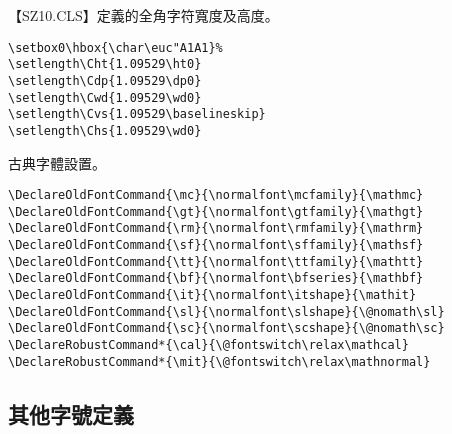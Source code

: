 \par 【SZ10.CLS】定義的全角字符寬度及高度。
\begin{lstlisting}[firstnumber=116]
\setbox0\hbox{\char\euc"A1A1}%
\setlength\Cht{1.09529\ht0}
\setlength\Cdp{1.09529\dp0}
\setlength\Cwd{1.09529\wd0}
\setlength\Cvs{1.09529\baselineskip}
\setlength\Chs{1.09529\wd0}
\end{lstlisting}



\par 古典字體設置。
\begin{lstlisting}[firstnumber=124]
\DeclareOldFontCommand{\mc}{\normalfont\mcfamily}{\mathmc}
\DeclareOldFontCommand{\gt}{\normalfont\gtfamily}{\mathgt}
\DeclareOldFontCommand{\rm}{\normalfont\rmfamily}{\mathrm}
\DeclareOldFontCommand{\sf}{\normalfont\sffamily}{\mathsf}
\DeclareOldFontCommand{\tt}{\normalfont\ttfamily}{\mathtt}
\DeclareOldFontCommand{\bf}{\normalfont\bfseries}{\mathbf}
\DeclareOldFontCommand{\it}{\normalfont\itshape}{\mathit}
\DeclareOldFontCommand{\sl}{\normalfont\slshape}{\@nomath\sl}
\DeclareOldFontCommand{\sc}{\normalfont\scshape}{\@nomath\sc}
\DeclareRobustCommand*{\cal}{\@fontswitch\relax\mathcal}
\DeclareRobustCommand*{\mit}{\@fontswitch\relax\mathnormal}
\end{lstlisting}

\subsection{其他字號定義}

